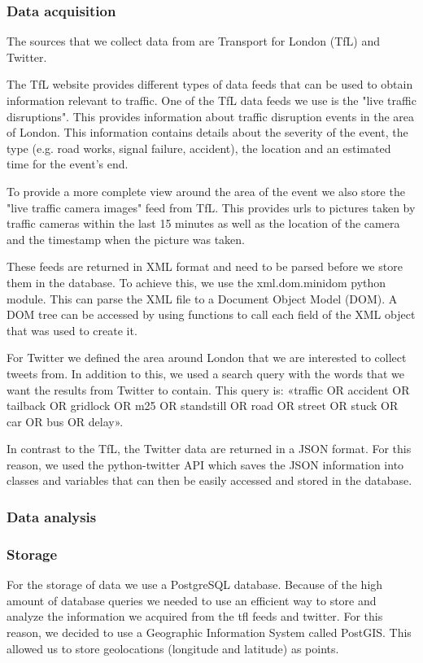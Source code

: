 \subsubsection{Data acquisition}
The sources that we collect data from are Transport for London (TfL) and Twitter.

The TfL website provides different types of data feeds that can be used to obtain information relevant to traffic. 
One of the TfL data feeds we use is the "live traffic disruptions". This provides information about traffic disruption events in the area of London. This information contains details about the severity of the event, the type (e.g. road works, signal failure, accident), the location and an estimated time for the event's end.

To provide a more complete view around the area of the event we also store the "live traffic camera images" feed from TfL. This provides urls to pictures taken by traffic cameras within the last 15 minutes as well as the location of the camera and the timestamp when the picture was taken.

These feeds are returned in XML format and need to be parsed before we store them in the database. To achieve this, we use the xml.dom.minidom python module. This can parse the XML file to a Document Object Model (DOM). A DOM tree can be accessed by using functions to call each field of the XML object that was used to create it.

For Twitter we defined the area around London that we are interested to collect tweets from. In addition to this, we used a search query with the words that we want the results from Twitter to contain. This query is:  «traffic OR accident OR tailback OR gridlock OR m25 OR standstill OR road OR street OR stuck OR car OR bus OR delay». 

In contrast to the TfL, the Twitter data are returned in a JSON format. For this reason, we used the python-twitter API which saves the JSON information into classes and variables that can then be easily accessed and stored in the database.

\subsubsection{Data analysis}
\subsubsection{Storage}
For the storage of data we use a PostgreSQL database. Because of the high amount of database queries we needed to use an efficient way to store and analyze the information we acquired from the tfl feeds and twitter. For this reason, we decided to use a Geographic Information System called PostGIS. This allowed us to store geolocations (longitude and latitude) as points.


